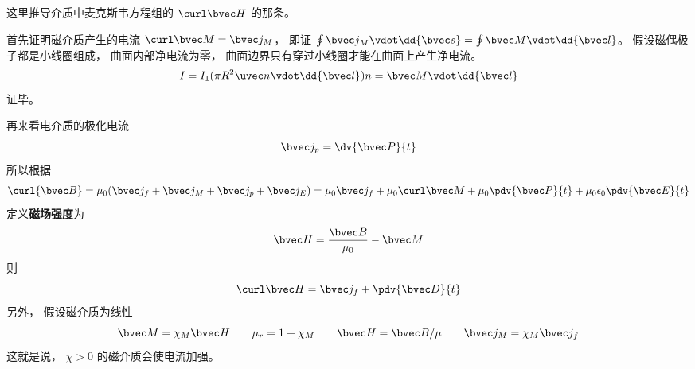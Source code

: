 


这里推导介质中麦克斯韦方程组的 $\curl \bvec H$ 的那条。

首先证明磁介质产生的电流 $\curl \bvec M = \bvec j_M$， 即证 $\oint \bvec j_M \vdot \dd{\bvec s} = \oint \bvec M \vdot \dd{\bvec l}$。 假设磁偶极子都是小线圈组成， 曲面内部净电流为零， 曲面边界只有穿过小线圈才能在曲面上产生净电流。
\begin{equation}
I = I_1 (\pi R^2 \uvec n \vdot \dd{\bvec l}) n = \bvec M \vdot \dd{\bvec l}
\end{equation}
证毕。

再来看电介质的极化电流
\begin{equation}
\bvec j_p = \dv{\bvec P}{t}
\end{equation}
所以根据
\begin{equation}
\curl {\bvec B} = \mu_0 (\bvec j_f + \bvec j_M + \bvec j_p + \bvec j_E) = \mu_0 \bvec j_f + \mu_0 \curl \bvec M + \mu_0 \pdv{\bvec P}{t} + \mu_0 \epsilon_0 \pdv{\bvec E}{t}
\end{equation}
定义\textbf{磁场强度}为
\begin{equation}
\bvec H = \frac{\bvec B}{\mu_0} - \bvec M
\end{equation}
则
\begin{equation}
\curl \bvec H = \bvec j_f + \pdv{\bvec D}{t}
\end{equation}
另外， 假设磁介质为线性
\begin{equation}
\bvec M = \chi_M \bvec H
\qquad
\mu_r = 1 + \chi_M
\qquad
\bvec H = \bvec B/\mu
\qquad
\bvec j_M = \chi_M \bvec j_f
\end{equation}
这就是说， $\chi > 0$ 的磁介质会使电流加强。
